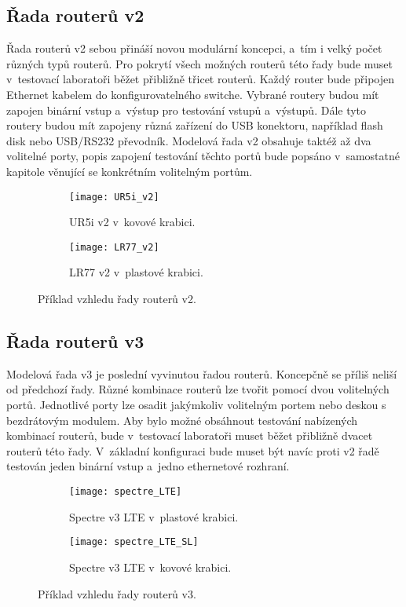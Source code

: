 \subsection{Řada routerů v2}
Řada routerů v2 sebou přináší novou modulární koncepci, a~tím i velký počet různých typů routerů. Pro pokrytí všech možných routerů této řady bude muset v~testovací laboratoři běžet přibližně třicet routerů. Každý router bude připojen Ethernet kabelem do konfigurovatelného switche. Vybrané routery budou mít zapojen binární vstup a~výstup pro testování vstupů a~výstupů. Dále tyto routery budou mít zapojeny různá zařízení do USB konektoru, například flash disk nebo USB/RS232 převodník. Modelová řada v2 obsahuje taktéž až dva volitelné porty, popis zapojení testování těchto portů bude popsáno v~samostatné kapitole věnující se konkrétním volitelným portům. \cite{uzivv2}

\begin{figure}[h]
  \begin{subfigure}[h]{0.5\LW}
    \centering
    \texttt{[image: UR5i\_v2]}
    \caption{UR5i v2 v~kovové krabici.}
    \label{fig:UR5i_v2}
  \end{subfigure}
  \begin{subfigure}[h]{0.5\LW}
    \centering
    \texttt{[image: LR77\_v2]}
    \caption{LR77 v2 v~plastové krabici.}
    \label{fig:LR77_v2}
  \end{subfigure}
  \caption{Příklad vzhledu řady routerů v2.}
  \label{fig:UR5i_v2}
\end{figure}

\subsection{Řada routerů v3}
Modelová řada v3 je poslední vyvinutou řadou routerů. Koncepčně se příliš neliší od předchozí řady. Různé kombinace routerů lze tvořit pomocí dvou volitelných portů. Jednotlivé porty lze osadit jakýmkoliv volitelným portem nebo deskou s bezdrátovým modulem. Aby bylo možné obsáhnout testování nabízených kombinací routerů, bude v~testovací laboratoři muset běžet přibližně dvacet routerů této řady. V~základní konfiguraci bude muset být navíc proti v2 řadě testován jeden binární vstup a~jedno ethernetové rozhraní. \cite{uzivv3}

\begin{figure}[h]
  \begin{subfigure}[h]{0.5\LW}
    \centering
    \texttt{[image: spectre\_LTE]}
    \caption{Spectre v3 LTE v~plastové krabici.}
    \label{fig:spectre_LTE}
  \end{subfigure}
  \begin{subfigure}[h]{0.5\LW}
    \centering
    \texttt{[image: spectre\_LTE\_SL]}
    \caption{Spectre v3 LTE v~kovové krabici.}
    \label{fig:spectre_LTE_SL}
  \end{subfigure}
  \caption{Příklad vzhledu řady routerů v3.}
  \label{fig:spectre_LTE}
\end{figure}

